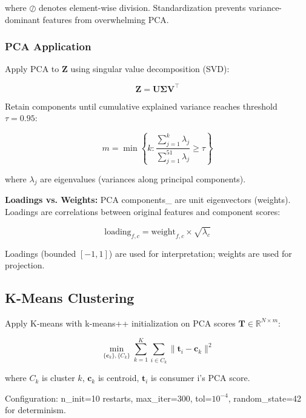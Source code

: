 \documentclass[11pt,a4paper]{article}
\begin{document}
where $\oslash$ denotes element-wise division. Standardization prevents variance-dominant features from overwhelming PCA.

\subsubsection{PCA Application}

Apply PCA to $\mathbf{Z}$ using singular value decomposition (SVD):

\begin{equation}
\mathbf{Z} = \mathbf{U} \boldsymbol{\Sigma} \mathbf{V}^\top
\end{equation}

Retain components until cumulative explained variance reaches threshold $\tau = 0.95$:

\begin{equation}
m = \min \left\{ k : \frac{\sum_{j=1}^{k} \lambda_j}{\sum_{j=1}^{51} \lambda_j} \geq \tau \right\}
\end{equation}

where $\lambda_j$ are eigenvalues (variances along principal components).

\textbf{Loadings vs. Weights:} PCA components\_ are unit eigenvectors (weights). Loadings are correlations between original features and component scores:

\begin{equation}
\text{loading}_{f,c} = \text{weight}_{f,c} \times \sqrt{\lambda_c}
\end{equation}

Loadings (bounded $[-1, 1]$) are used for interpretation; weights are used for projection.

\subsection{K-Means Clustering}
\label{sec:kmeans}

Apply K-means \cite{lloyd1982least} with k-means++ initialization \cite{arthur2007kmeans} on PCA scores $\mathbf{T} \in \mathbb{R}^{N \times m}$:

\begin{equation}
\min_{\{\mathbf{c}_k\}, \{C_k\}} \sum_{k=1}^{K} \sum_{i \in C_k} \| \mathbf{t}_i - \mathbf{c}_k \|^2
\end{equation}

where $C_k$ is cluster $k$, $\mathbf{c}_k$ is centroid, $\mathbf{t}_i$ is consumer i's PCA score.

Configuration: n\_init=10 restarts, max\_iter=300, tol=$10^{-4}$, random\_state=42 for determinism.
\end{document}
